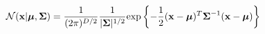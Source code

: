 $${\cal N}({\bf x}|{\boldsymbol \mu}, {\boldsymbol \Sigma})=\frac{1}{(2\pi)^{D/2}}\frac{1}{|{\boldsymbol \Sigma}|^{1/2}}{\rm exp}\left\{ -\frac{1}{2}({\bf x}-{\boldsymbol \mu})^{T}{\boldsymbol \Sigma}^{-1}({\bf x}-{\boldsymbol \mu}) \right\}$$
